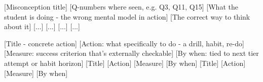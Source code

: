 \documentclass[11pt,a4paper]{article}
\begin{document}
\begin{tsMisconceptions}
    \tsMisconception%
        {[Misconception title]}%
        {[Q-numbers where seen, e.g. Q3, Q11, Q15]}%
        {[What the student is doing - the wrong mental model in action]}%
        {[The correct way to think about it]}
    \tsMisconception%
        {[...]}%
        {[...]}%
        {[...]}%
        {[...]}
\end{tsMisconceptions}


\tsSWOT
    {%
    }
    {%
    }
    {%
    }
    {%
    }


\begin{tsImprovements}
        {[Title - concrete action]}%
        {[Action: what specifically to do - a drill, habit, re-do]}%
        {[Measure: success criterion that's externally checkable]}%
        {[By when: tied to next tier attempt or habit horizon]}
        {[Title]}%
        {[Action]}%
        {[Measure]}%
        {[By when]}
        {[Title]}%
        {[Action]}%
        {[Measure]}%
        {[By when]}
\end{tsImprovements}

\end{document}
